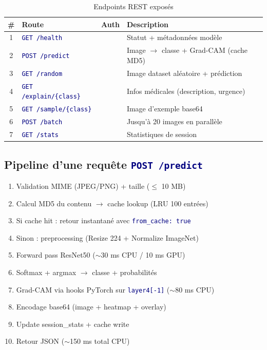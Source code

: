 \documentclass[11pt,a4paper,oneside]{report}
\newcommand{\cmark}{\ding{51}}
\newcommand{\xmark}{\ding{55}}
\newcommand{\code}[1]{\texttt{\textcolor{navy}{#1}}}
\newcommand{\rt}[1]{\textcolor{accentred}{#1}}
\newcommand{\gn}[1]{\textcolor{accentgreen}{#1}}
\begin{document}
\begin{table}[!htbp]
\centering
\caption{Endpoints REST exposés}
\begin{tabularx}{\textwidth}{|c|l|c|X|}
\hline
\textbf{\#} & \textbf{Route} & \textbf{Auth} & \textbf{Description} \\
\hline
1 & \code{GET /health} & \rt{\xmark} & Statut + métadonnées modèle \\
\hline
2 & \code{POST /predict} & \gn{\cmark} & Image $\to$ classe + Grad-CAM (cache MD5) \\
\hline
3 & \code{GET /random} & \rt{\xmark} & Image dataset aléatoire + prédiction \\
\hline
4 & \code{GET /explain/\{class\}} & \rt{\xmark} & Infos médicales (description, urgence) \\
\hline
5 & \code{GET /sample/\{class\}} & \rt{\xmark} & Image d'exemple base64 \\
\hline
6 & \code{POST /batch} & \gn{\cmark} & Jusqu'à 20 images en parallèle \\
\hline
7 & \code{GET /stats} & \rt{\xmark} & Statistiques de session \\
\hline
\end{tabularx}
\end{table}

\subsection{Pipeline d'une requête \code{POST /predict}}

\begin{enumerate}
\item Validation MIME (JPEG/PNG) + taille ($\leq$ 10 MB)
\item Calcul MD5 du contenu $\to$ cache lookup (LRU 100 entrées)
\item Si cache hit : retour instantané avec \code{from\_cache: true}
\item Sinon : preprocessing (Resize 224 + Normalize ImageNet)
\item Forward pass ResNet50 ($\sim$30 ms CPU / 10 ms GPU)
\item Softmax + argmax $\to$ classe + probabilités
\item Grad-CAM via hooks PyTorch sur \code{layer4[-1]} ($\sim$80 ms CPU)
\item Encodage base64 (image + heatmap + overlay)
\item Update session\_stats + cache write
\item Retour JSON ($\sim$150 ms total CPU)
\end{enumerate}
\end{document}

